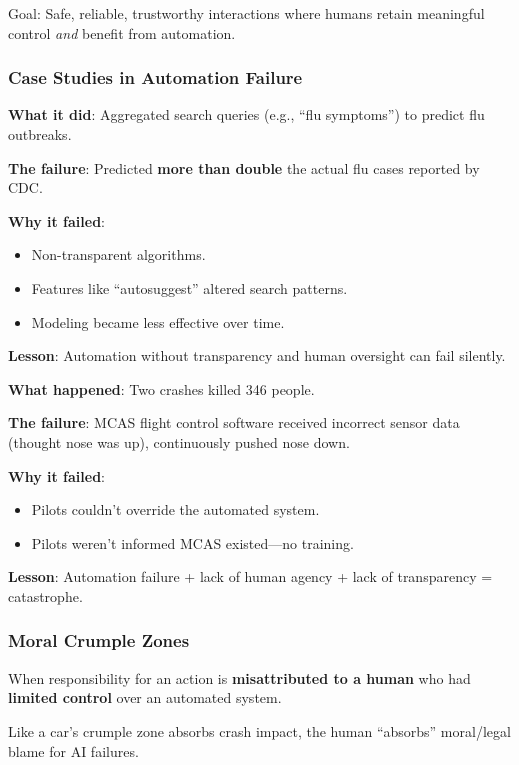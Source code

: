 Goal: Safe, reliable, trustworthy interactions where humans retain meaningful control \textit{and} benefit from automation.

\subsubsection*{Case Studies in Automation Failure}

\begin{exbox}
\textbf{What it did}: Aggregated search queries (e.g., ``flu symptoms'') to predict flu outbreaks.

\textbf{The failure}: Predicted \textbf{more than double} the actual flu cases reported by CDC.

\textbf{Why it failed}:
\begin{itemize}
  \item Non-transparent algorithms.
  \item Features like ``autosuggest'' altered search patterns.
  \item Modeling became less effective over time.
\end{itemize}

\textbf{Lesson}: Automation without transparency and human oversight can fail silently.
\end{exbox}

\begin{exbox}
\textbf{What happened}: Two crashes killed 346 people.

\textbf{The failure}: MCAS flight control software received incorrect sensor data (thought nose was up), continuously pushed nose down.

\textbf{Why it failed}:
\begin{itemize}
  \item Pilots couldn't override the automated system.
  \item Pilots weren't informed MCAS existed---no training.
\end{itemize}

\textbf{Lesson}: Automation failure + lack of human agency + lack of transparency = catastrophe.
\end{exbox}

\subsubsection*{Moral Crumple Zones}

\begin{defbox}
When responsibility for an action is \textbf{misattributed to a human} who had \textbf{limited control} over an automated system.

Like a car's crumple zone absorbs crash impact, the human ``absorbs'' moral/legal blame for AI failures.
\end{defbox}


